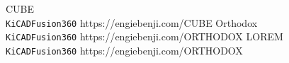 \documentclass[9pt]{developercv} %
\begin{document}
\vspace{0.5cm}


\begin{entrylist}
	\QRentry
		{CUBE}
		{\lorem\lorem\lorem\\ \texttt{KiCAD}\slashsep\texttt{Fusion360}}
		{https://engiebenji.com/CUBE}
	\QRentry
		{Orthodox}
		{\lorem\lorem\\ \texttt{KiCAD}\slashsep\texttt{Fusion360}}
		{https://engiebenji.com/ORTHODOX}
	\QRentry
		{LOREM}
		{\lorem\lorem\\ \texttt{KiCAD}\slashsep\texttt{Fusion360}}
		{https://engiebenji.com/ORTHODOX}
\end{entrylist}

\end{document}
